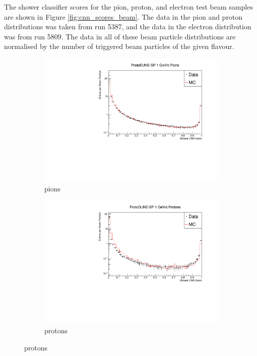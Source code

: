 The shower classifier scores for the pion, proton, and electron test beam 
samples are shown in Figure \ref{fig:cnn_scores_beam}. The data in the pion 
and proton distributions was taken from \protodune{} run 5387, and the data in 
the electron distribution was from run 5809. The data in all of these beam
particle distributions are normalised by the number of triggered 
beam particles of the given flavour.
\begin{figure}

	\centering

	\begin{subfigure}[b]{0.7\textwidth}
		\centering
		\includegraphics[width=\textwidth]{figures/hit_cnn_pion.pdf}
		\caption {pions}
		\label{fig:beam_pi_cnn}
	\end{subfigure}

	\begin{subfigure}[b]{0.7\textwidth}
		\centering
		\includegraphics[width=\textwidth]{figures/hit_cnn_proton.pdf}
		\caption {protons}
		\label{fig:beam_proton_cnn}
	\end{subfigure}


\end{figure}
